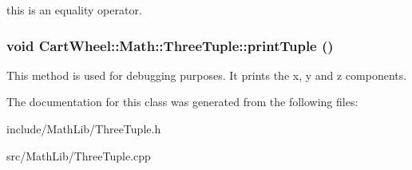 \label{classCartWheel_1_1Math_1_1ThreeTuple_a2a8a513c11d07504ad63172d9229f7b2}
this is an equality operator. \hypertarget{classCartWheel_1_1Math_1_1ThreeTuple_a65e25453060b2ccbfd1cd9a2f87b5078}{
\subsubsection[{printTuple}]{\setlength{\rightskip}{0pt plus 5cm}void CartWheel::Math::ThreeTuple::printTuple ()}}
\label{classCartWheel_1_1Math_1_1ThreeTuple_a65e25453060b2ccbfd1cd9a2f87b5078}
This method is used for debugging purposes. It prints the x, y and z components. 

The documentation for this class was generated from the following files:\begin{DoxyCompactItemize}
\item 
include/MathLib/ThreeTuple.h\item 
src/MathLib/ThreeTuple.cpp\end{DoxyCompactItemize}
